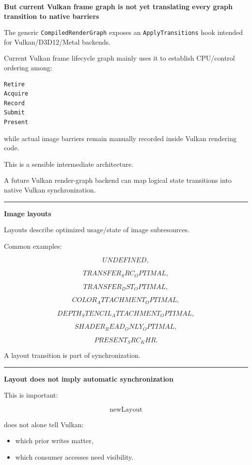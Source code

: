 \textbf{But current Vulkan frame graph is not yet translating every graph transition to native barriers}

The generic \texttt{CompiledRenderGraph} exposes an \texttt{ApplyTransitions} hook intended for Vulkan/D3D12/Metal backends.

Current Vulkan frame lifecycle graph mainly uses it to establish CPU/control ordering among:

\begin{verbatim}
Retire
Acquire
Record
Submit
Present
\end{verbatim}

while actual image barriers remain manually recorded inside Vulkan rendering code.

This is a sensible intermediate architecture.

A future Vulkan render-graph backend can map logical state transitions into native Vulkan synchronization.

\begin{center}\rule{0.5\linewidth}{0.5pt}\end{center}

\textbf{Image layouts}

Layouts describe optimized usage/state of image subresources.

Common examples:

\[
UNDEFINED,
\]

\[
TRANSFER_SRC_OPTIMAL,
\]

\[
TRANSFER_DST_OPTIMAL,
\]

\[
COLOR_ATTACHMENT_OPTIMAL,
\]

\[
DEPTH_STENCIL_ATTACHMENT_OPTIMAL,
\]

\[
SHADER_READ_ONLY_OPTIMAL,
\]

\[
PRESENT_SRC_KHR.
\]

A layout transition is part of synchronization.

\begin{center}\rule{0.5\linewidth}{0.5pt}\end{center}

\textbf{Layout does not imply automatic synchronization}

This is important:

\[
\boxed{
\text{newLayout}
}
\]

does not alone tell Vulkan:

\begin{itemize}
\tightlist
\item
  which prior writes matter,
\item
  which consumer accesses need visibility.
\end{itemize}

